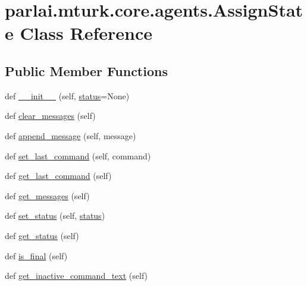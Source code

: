 \hypertarget{classparlai_1_1mturk_1_1core_1_1agents_1_1AssignState}{}\section{parlai.\+mturk.\+core.\+agents.\+Assign\+State Class Reference}
\label{classparlai_1_1mturk_1_1core_1_1agents_1_1AssignState}
\subsection*{Public Member Functions}
\begin{DoxyCompactItemize}
\item 
def \hyperlink{classparlai_1_1mturk_1_1core_1_1agents_1_1AssignState_aace503a7d51d513573c41ac25cd6510f}{\+\_\+\+\_\+init\+\_\+\+\_\+} (self, \hyperlink{classparlai_1_1mturk_1_1core_1_1agents_1_1AssignState_a1d77495a7694cc88c937c06d4d4d039e}{status}=None)
\item 
def \hyperlink{classparlai_1_1mturk_1_1core_1_1agents_1_1AssignState_a6a683e69e6ba2fc0db6570a7af70d1c0}{clear\+\_\+messages} (self)
\item 
def \hyperlink{classparlai_1_1mturk_1_1core_1_1agents_1_1AssignState_a655ebb0e19f6a1b66416848bc2abca27}{append\+\_\+message} (self, message)
\item 
def \hyperlink{classparlai_1_1mturk_1_1core_1_1agents_1_1AssignState_a6251191f5a8d16778dc56e21564ede79}{set\+\_\+last\+\_\+command} (self, command)
\item 
def \hyperlink{classparlai_1_1mturk_1_1core_1_1agents_1_1AssignState_a50b030308201e7e8e91292ec2419400b}{get\+\_\+last\+\_\+command} (self)
\item 
def \hyperlink{classparlai_1_1mturk_1_1core_1_1agents_1_1AssignState_a969247ece20ee74e12196bd5b5c448cc}{get\+\_\+messages} (self)
\item 
def \hyperlink{classparlai_1_1mturk_1_1core_1_1agents_1_1AssignState_a7cd23ff37c1c1e0c6d8548f77a8d078c}{set\+\_\+status} (self, \hyperlink{classparlai_1_1mturk_1_1core_1_1agents_1_1AssignState_a1d77495a7694cc88c937c06d4d4d039e}{status})
\item 
def \hyperlink{classparlai_1_1mturk_1_1core_1_1agents_1_1AssignState_a14f5a0cbaf099fb25cfa284a502a8275}{get\+\_\+status} (self)
\item 
def \hyperlink{classparlai_1_1mturk_1_1core_1_1agents_1_1AssignState_a95b2a76b6e8ec7e045542450ee49f971}{is\+\_\+final} (self)
\item 
def \hyperlink{classparlai_1_1mturk_1_1core_1_1agents_1_1AssignState_aeda3adf715e8ed5a39d302792b056960}{get\+\_\+inactive\+\_\+command\+\_\+text} (self)
\end{DoxyCompactItemize}
